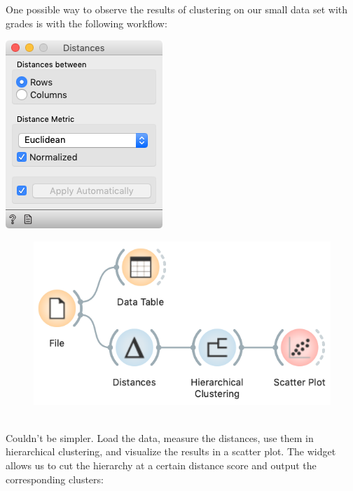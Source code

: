 \clearpage

One possible way to observe the results of clustering on our small data set with grades is with the following workflow:

\begin{marginfigure}
    \centering
    \includegraphics[scale=0.6]{distances.png}
\end{marginfigure}

\begin{figure}[h]
    \centering
    \includegraphics[scale=0.4]{workflow_clustering.png}
    \caption{$\;$} %
\end{figure}

Couldn’t be simpler. Load the data, measure the distances, use them in hierarchical clustering, and visualize the results in a scatter plot. The  widget allows us to cut the hierarchy at a certain distance score and output the corresponding clusters:

